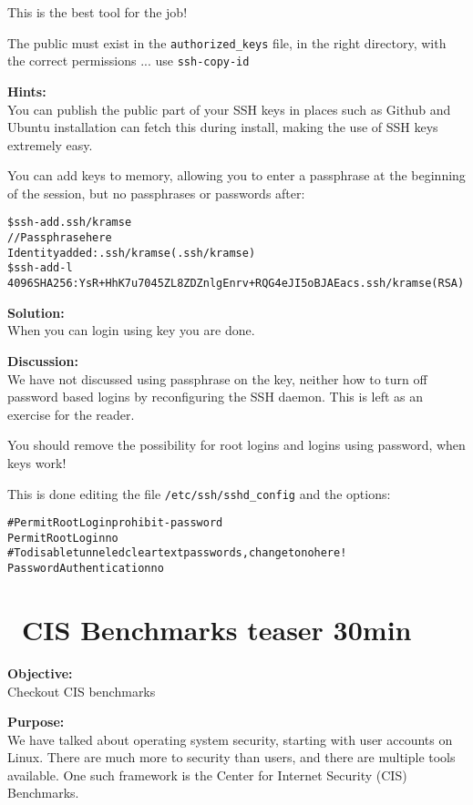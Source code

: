 \documentclass[a4paper,11pt,notitlepage]{report}
\begin{document}
\vskip 5mm

\centerline{This is the best tool for the job!}

The public must exist in the \verb+authorized_keys+ file, in the right directory, with the correct permissions ... use \verb+ssh-copy-id+

{\bf Hints:}\\
You can publish the public part of your SSH keys in places such as Github and Ubuntu installation can fetch this during install, making the use of SSH keys extremely easy.

You can add keys to memory, allowing you to enter a passphrase at the beginning of the session, but no passphrases or passwords after:

\begin{alltt}
\$ ssh-add .ssh/kramse
// Passphrase here
Identity added: .ssh/kramse (.ssh/kramse)
\$ ssh-add -l
4096 SHA256:YsR+HhK7u7045ZL8ZDZnlgEnrv+RQG4eJI5oBJAEacs .ssh/kramse (RSA)
\end{alltt}


{\bf Solution:}\\
When you can login using key you are done.

{\bf Discussion:}\\
We have not discussed using passphrase on the key, neither how to turn off password based logins by reconfiguring the SSH daemon. This is left as an exercise for the reader.

You should remove the possibility for root logins and logins using password, when keys work!

This is done editing the file \verb+/etc/ssh/sshd_config+ and the options:
\begin{alltt}
#PermitRootLogin prohibit-password
PermitRootLogin no
# To disable tunneled clear text passwords, change to no here!
PasswordAuthentication no
\end{alltt}



\chapter{\faExclamationTriangle\ CIS Benchmarks teaser 30min}
\label{ex:CIS-benchmarks-teaser}

{\bf Objective:}\\
Checkout CIS benchmarks

{\bf Purpose:}\\
We have talked about operating system security, starting with user accounts on Linux. There are much more to security than users, and there are multiple tools available. One such framework is the Center for Internet Security (CIS) Benchmarks.
\end{document}
